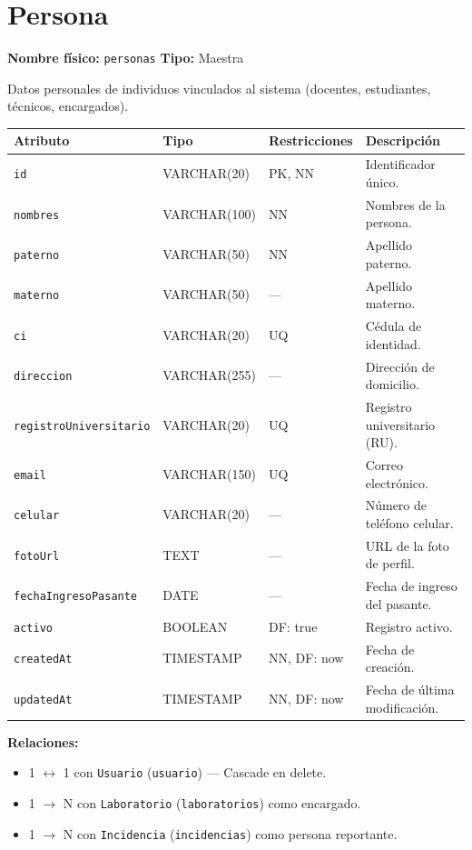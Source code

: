 \documentclass[12pt,a4paper]{article}
\newenvironment{tabladesc}[3]{%
  \section{#1}
  \textbf{Nombre físico:} \texttt{#2} \hfill \textbf{Tipo:} #3\par
  \medskip
}{%
  \bigskip
}
\begin{document}
\begin{tabladesc}{Persona}{personas}{Maestra}

Datos personales de individuos vinculados al sistema (docentes, estudiantes, técnicos, encargados).

\bigskip
\begin{longtable}{L{3.5cm} L{2.5cm} L{2cm} L{7.5cm}}
\toprule
\textbf{Atributo} & \textbf{Tipo} & \textbf{Restricciones} & \textbf{Descripción} \\
\midrule
\endhead
\bottomrule
\endfoot
\texttt{id}                & VARCHAR(20)  & PK, NN & Identificador único. \\
\texttt{nombres}           & VARCHAR(100) & NN     & Nombres de la persona. \\
\texttt{paterno}           & VARCHAR(50)  & NN     & Apellido paterno. \\
\texttt{materno}           & VARCHAR(50)  & ---    & Apellido materno. \\
\texttt{ci}                & VARCHAR(20)  & UQ     & Cédula de identidad. \\
\texttt{direccion}         & VARCHAR(255) & ---    & Dirección de domicilio. \\
\texttt{registroUniversitario} & VARCHAR(20) & UQ  & Registro universitario (RU). \\
\texttt{email}             & VARCHAR(150) & UQ     & Correo electrónico. \\
\texttt{celular}           & VARCHAR(20)  & ---    & Número de teléfono celular. \\
\texttt{fotoUrl}           & TEXT         & ---    & URL de la foto de perfil. \\
\texttt{fechaIngresoPasante}& DATE        & ---    & Fecha de ingreso del pasante. \\
\texttt{activo}            & BOOLEAN      & DF: true & Registro activo. \\
\texttt{createdAt}         & TIMESTAMP    & NN, DF: now & Fecha de creación. \\
\texttt{updatedAt}         & TIMESTAMP    & NN, DF: now & Fecha de última modificación. \\
\bottomrule
\end{longtable}

\textbf{Relaciones:}
\begin{itemize}[nosep]
  \item 1 $\leftrightarrow$ 1 con \texttt{Usuario} (\texttt{usuario}) — Cascade en delete.
  \item 1 $\rightarrow$ N con \texttt{Laboratorio} (\texttt{laboratorios}) como encargado.
  \item 1 $\rightarrow$ N con \texttt{Incidencia} (\texttt{incidencias}) como persona reportante.
\end{itemize}
\end{tabladesc}
\end{document}
